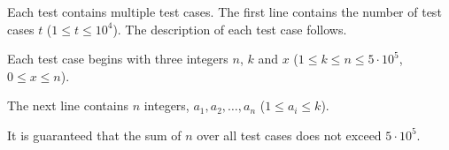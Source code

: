 Each test contains multiple test cases. The first line contains the number of test cases
$t$ ($1 \leq t \leq 10^4$). The description of each test case follows.

Each test case begins with three integers
$n$, $k$ and $x$ ($1 \leq k \leq n \leq 5 \cdot 10^5$, $0 \leq x \leq n$).

The next line contains $n$ integers, $a_1, a_2, \ldots, a_n$ ($1 \leq a_i \leq k$).

It is guaranteed that the sum of $n$ over all test cases does not exceed $5 \cdot 10^5$.
